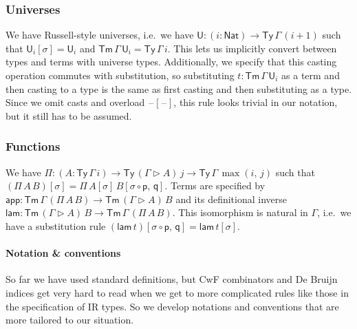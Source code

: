 \documentclass[acmsmall,screen,review,anonymous]{acmart}
\newcommand{\msf}[1]{{\mathsf{#1}}}
\newcommand{\p}{\mathsf{p}}
\newcommand{\q}{\mathsf{q}}
\newcommand{\U}{\msf{U}}
\newcommand{\Nat}{\msf{Nat}}
\newcommand{\blank}{{\mathord{\hspace{1pt}\text{--}\hspace{1pt}}}}
\newcommand{\Ty}{\msf{Ty}}
\newcommand{\Tm}{\msf{Tm}}
\newcommand{\ext}{\triangleright}
\newcommand{\lam}{\msf{lam}}
\newcommand{\app}{\msf{app}}
\begin{document}
\subsubsection{Universes}
We have Russell-style universes, i.e.\ we have $\U : (i : \Nat) \to \Ty\,\Gamma\,(i + 1)$ such that
$\U_i[\sigma] = \U_i$ and $\Tm\,\Gamma\,\U_i = \Ty\,\Gamma\,i$.  This lets us implicitly convert
between types and terms with universe types. Additionally, we specify that this casting operation
commutes with substitution, so substituting $t : \Tm\,\Gamma\,\U_i$ as a term and then casting to a
type is the same as first casting and then substituting as a type. Since we omit casts and overload
$\blank[\blank]$, this rule looks trivial in our notation, but it still has to be assumed.

\subsubsection{Functions} We have $\Pi : (A : \Ty\,\Gamma\,i) \to \Ty\,(\Gamma \ext A)\,j \to \Ty\,\Gamma\,\max(i,\,j)$
such that $(\Pi\,A\,B)[\sigma] = \Pi\,A[\sigma]\,B[\sigma\circ\p,\,\q]$.  Terms are specified by
$\app : \Tm\,\Gamma\,(\Pi\,A\,B) \to \Tm\,(\Gamma\ext A)\,B$ and its definitional inverse $\lam :
\Tm\,(\Gamma\ext A)\,B \to \Tm\,\Gamma\,(\Pi\,A\,B)$. This isomorphism is natural in $\Gamma$,
i.e.\ we have a substitution rule $(\lam\,t)[\sigma\circ\p,\,\q] = \lam\,t[\sigma]$.

\paragraph{Notation \& conventions} So far we have used standard definitions, but
CwF combinators and De Bruijn indices get very hard to read when we get to more complicated
rules like those in the specification of IR types. So we develop notations and conventions that are
more tailored to our situation.
\end{document}

